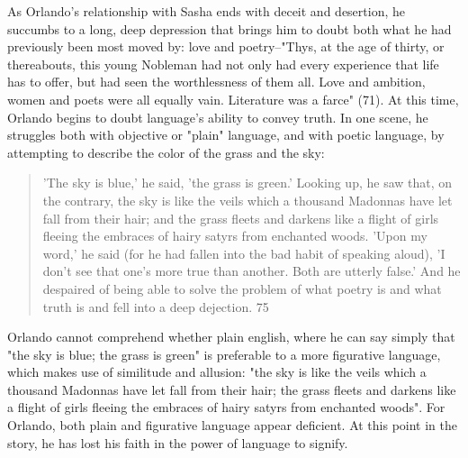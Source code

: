 \documentclass[11pt]{article}
\begin{document}
As Orlando's relationship with Sasha ends with deceit and desertion,
he succumbs to a long, deep depression that brings him to doubt both
what he had previously been most moved by: love and poetry--"Thys, at
the age of thirty, or thereabouts, this young Nobleman had not only
had every experience that life has to offer, but had seen the
worthlessness of them all. Love and ambition, women and poets were all
equally vain. Literature was a farce" (71). At this time, Orlando
begins to doubt language's ability to convey truth. In one scene, he
struggles both with objective or "plain" language, and with poetic
language, by attempting to describe the color of the grass and the
sky:
\begin{quote}
'The sky is blue,' he said, 'the grass is green.' Looking up, he saw
that, on the contrary, the sky is like the veils which a thousand
Madonnas have let fall from their hair; and the grass fleets and
darkens like a flight of girls fleeing the embraces of hairy satyrs
from enchanted woods. 'Upon my word,' he said (for he had fallen into
the bad habit of speaking aloud), 'I don't see that one's more true
than another. Both are utterly false.' And he despaired of being able
to solve the problem of what poetry is and what truth is and fell into
a deep dejection. 75
\end{quote}
Orlando cannot comprehend whether plain english, where he can say
simply that "the sky is blue; the grass is green" is preferable to a
more figurative language, which makes use of similitude and allusion:
"the sky is like the veils which a thousand Madonnas have let fall
from their hair; the grass fleets and darkens like a flight of girls
fleeing the embraces of hairy satyrs from enchanted woods". For
Orlando, both plain and figurative language appear deficient. At this
point in the story, he has lost his faith in the power of language to
signify. 
\end{document}
